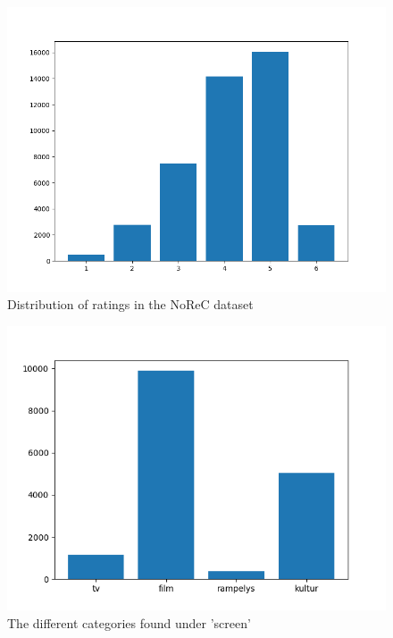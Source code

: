 \begin{figure}[h!]
	\centering
	\includegraphics[scale=0.5]{img/ratings_new}
	\caption{Distribution of ratings in the NoReC dataset}
	\label{fig:ratings}
\end{figure}%
\begin{figure}[h!]
	\centering
	\includegraphics[scale=0.5]{img/screen_categories}
	\caption{The different categories found under 'screen'}
	\label{fig:screen}
\end{figure}%
